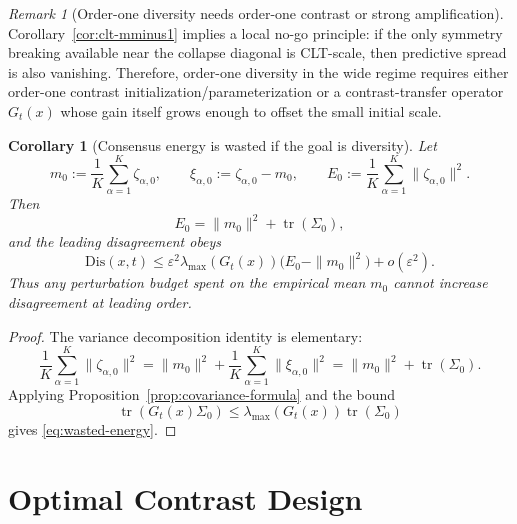 \documentclass[11pt]{article}
\newcommand{\tr}{\operatorname{tr}}
\newtheorem{corollary}[theorem]{Corollary}
\theoremstyle{remark}
\newtheorem{remark}[theorem]{Remark}
\begin{document}
\begin{remark}[Order-one diversity needs order-one contrast or strong amplification]
Corollary~\ref{cor:clt-mminus1} implies a local no-go principle: if the only symmetry breaking available near the collapse diagonal is CLT-scale, then predictive spread is also vanishing. Therefore, order-one diversity in the wide regime requires either order-one contrast initialization/parameterization or a contrast-transfer operator $G_t(x)$ whose gain itself grows enough to offset the small initial scale.
\end{remark}

\begin{corollary}[Consensus energy is wasted if the goal is diversity]
\label{cor:wasted-energy}
Let
\[
m_0 := \frac1K\sum_{\alpha=1}^K \zeta_{\alpha,0},
\qquad
\xi_{\alpha,0} := \zeta_{\alpha,0}-m_0,
\qquad
E_0 := \frac1K\sum_{\alpha=1}^K \|\zeta_{\alpha,0}\|^2.
\]
Then
\[
E_0 = \|m_0\|^2 + \tr(\Sigma_0),
\]
and the leading disagreement obeys
\begin{equation}
\mathrm{Dis}(x,t)
\le
\varepsilon^2 \lambda_{\max}(G_t(x))\bigl(E_0-\|m_0\|^2\bigr)
 + o(\varepsilon^2).
\label{eq:wasted-energy}
\end{equation}
Thus any perturbation budget spent on the empirical mean $m_0$ cannot increase disagreement at leading order.
\end{corollary}

\begin{proof}
The variance decomposition identity is elementary:
\[
\frac1K\sum_{\alpha=1}^K \|\zeta_{\alpha,0}\|^2
=
\|m_0\|^2 + \frac1K\sum_{\alpha=1}^K \|\xi_{\alpha,0}\|^2
=
\|m_0\|^2 + \tr(\Sigma_0).
\]
Applying Proposition~\ref{prop:covariance-formula} and the bound
\[
\tr(G_t(x)\Sigma_0)
\le
\lambda_{\max}(G_t(x))\tr(\Sigma_0)
\]
gives \eqref{eq:wasted-energy}.
\end{proof}

\section{Optimal Contrast Design}
\end{document}
